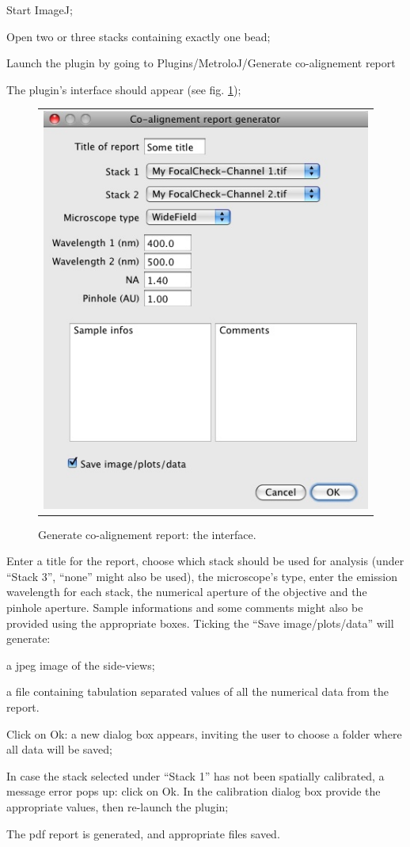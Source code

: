 \documentclass[a4paper, 11pt]{report}%
\begin{document}
\begin{enumerate*}
	\item Start ImageJ;
	\item Open two or three stacks containing exactly one bead;
	\item Launch the plugin by going to Plugins/MetroloJ/Generate co-alignement report
	\item The plugin's interface should appear (see fig. \ref{fig:gcoar-interf}); 
		\begin{figure}[!ht]
			\begin{center}
				\begin{tabular}{c}
					\includegraphics[width=0.35\linewidth]{img/gcoar-interf}
				\end{tabular}
			\end{center}
			\caption{\label{fig:gcoar-interf}Generate co-alignement report: the interface.}
		\end{figure} 
	\item Enter a title for the report, choose which stack should be used for analysis (under ``Stack 3'', ``none'' might also be used), the microscope's type, enter the emission wavelength for each stack, the numerical aperture of the objective and the pinhole aperture. Sample informations and some comments might also be provided using the appropriate boxes. Ticking the ``Save image/plots/data'' will generate:
	\begin{itemize*}
		\item a jpeg image of the side-views;
		\item a file containing tabulation separated values of all the numerical data from the report.
	\end{itemize*}
	\item Click on Ok: a new dialog box appears, inviting the user to choose a folder where all data will be saved;
	\item In case the stack selected under ``Stack 1'' has not been spatially calibrated, a message error pops up: click on Ok. In the calibration dialog box provide the appropriate values, then re-launch the plugin;
	\item The pdf report is generated, and appropriate files saved.
\end{enumerate*}
\end{document}
